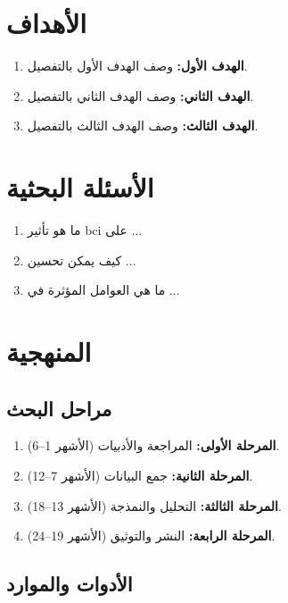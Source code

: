\documentclass[11pt,a4paper]{article}
\begin{document}
\section{الأهداف}
\label{sec:objectives}

\begin{enumerate}
    \item \textbf{الهدف الأول:} وصف الهدف الأول بالتفصيل.
    \item \textbf{الهدف الثاني:} وصف الهدف الثاني بالتفصيل.
    \item \textbf{الهدف الثالث:} وصف الهدف الثالث بالتفصيل.
\end{enumerate}

\section{الأسئلة البحثية}
\label{sec:questions}

\begin{enumerate}
    \item ما هو تأثير \acrfull{bci} على ...
    \item كيف يمكن تحسين ...
    \item ما هي العوامل المؤثرة في ...
\end{enumerate}

\section{المنهجية}
\label{sec:method}

\subsection{مراحل البحث}
\begin{enumerate}
    \item \textbf{المرحلة الأولى:} المراجعة والأدبيات (الأشهر 1--6).
    \item \textbf{المرحلة الثانية:} جمع البيانات (الأشهر 7--12).
    \item \textbf{المرحلة الثالثة:} التحليل والنمذجة (الأشهر 13--18).
    \item \textbf{المرحلة الرابعة:} النشر والتوثيق (الأشهر 19--24).
\end{enumerate}

\subsection{الأدوات والموارد}
\end{document}
